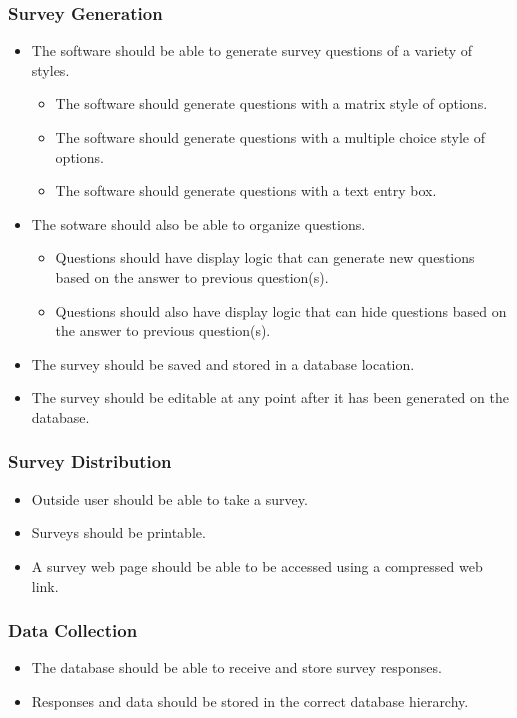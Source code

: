\documentclass[letterpaper,10pt,titlepage, draftclsnofoot,onecolumn]{IEEEtran}
\begin{document}
\subsubsection{Survey Generation}
\begin{itemize}
\item The software should be able to generate survey questions of a variety of styles.
	\begin{itemize}
	\item The software should generate questions with a matrix style of options.
	\item The software should generate questions with a multiple choice style of options.
	\item The software should generate questions with a text entry box.
	\end{itemize}
\item The sotware should also be able to organize questions.
	\begin{itemize}
	\item Questions should have display logic that can generate new questions based on the answer to previous question(s).
	\item Questions should also have display logic that can hide questions based on the answer to previous question(s).
	\end{itemize}
\item The survey should be saved and stored in a database location.
\item The survey should be editable at any point after it has been generated on the database.
\end{itemize}

\subsubsection{Survey Distribution}
\begin{itemize}
\item Outside user should be able to take a survey.
\item Surveys should be printable.
\item A survey web page should be able to be accessed using a compressed web link.
\end{itemize}

\subsubsection{Data Collection}
\begin{itemize}
\item The database should be able to receive and store survey responses.
\item Responses and data should be stored in the correct database hierarchy.
\end{itemize}
\end{document}
